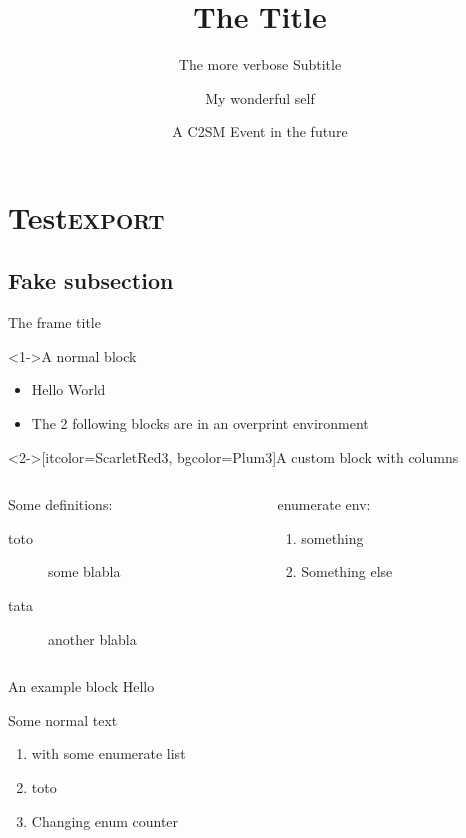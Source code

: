 \documentclass[presentation, aspectratio=169]{beamer}
\author{My wonderful self}
\date{A C2SM Event in the future}
\title{The Title}
\subtitle{The more verbose Subtitle}
\begin{document}
\maketitle
\section{Test\hfill{}\textsc{export}}
\label{sec:orgef73b72}

\subsection{Fake subsection}
\label{sec:org3a83fdc}

\begin{frame}[label={sec:orgad71931}]{The frame title}

\begin{block}<1->{A normal block}
\begin{itemize}
\item Hello World
\item The 2 following blocks are in an overprint environment
\end{itemize}
\end{block}

\begin{overprint}

\begin{customblock}<2->[itcolor=ScarletRed3, bgcolor=Plum3]{A custom block with columns}
\begin{columns}
\begin{column}{0.6\columnwidth}
Some definitions:
\begin{description}
\item[{toto}] some blabla
\item[{tata}] another blabla
\end{description}
\end{column}

\begin{column}{0.3\columnwidth}
enumerate env:
\begin{enumerate}
\item something
\item Something else
\end{enumerate}
\end{column}
\end{columns}
\end{customblock}


\begin{exampleblock}{An example block}
Hello
\end{exampleblock}
\end{overprint}

Some normal text
\begin{enumerate}
\item with some enumerate list
\item toto
\setcounter{enumi}{5}
\item Changing enum counter
\end{enumerate}
\end{frame}
\end{document}
